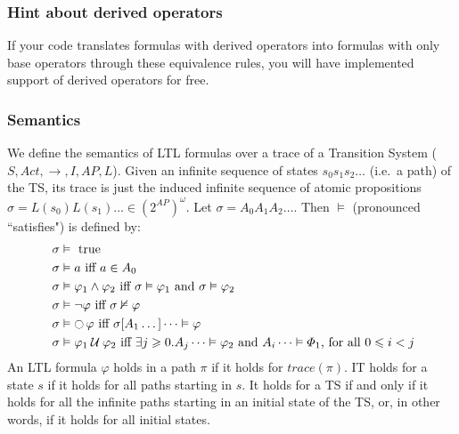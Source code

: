 \documentclass{article}
\begin{document}
\subsubsection*{Hint about derived operators}
If your code translates formulas with derived operators into formulas 
with only base operators through these equivalence rules, you will have implemented support of 
derived operators for free.

\subsubsection*{Semantics}
We define the semantics of LTL formulas over a trace of a Transition System ($S, Act, \rightarrow, I, AP, L$). 
Given an infinite sequence of states $s_0s_1s_2 \dots$ (i.e.~a path) of the TS, 
its trace is just the induced infinite sequence of atomic propositions $ \sigma = L(s_0)L(s_1) \dots \in (2^{AP})^{\omega}$.
Let $\sigma = A_0A_1A_2 \dots$. Then $\vDash$ (pronounced ``satisfies") is defined by:
\begin{align*}
    &\; \sigma \vDash \text{ true} \\
    &\; \sigma \vDash a \text{ iff } a \in A_0 \\
    &\; \sigma \vDash \varphi_1 \land \varphi_2 \text{ iff } \sigma \vDash \varphi_1 \text{ and } \sigma \vDash \varphi_2 \\
    &\; \sigma \vDash \neg \varphi \text{ iff } \sigma \nvDash \varphi \\
    &\; \sigma \vDash \mathop{\ocircle}{\varphi} \text{ iff } \sigma [A_1 \dots] \dots \vDash \varphi \\
    &\; \sigma \vDash \varphi_1 \mathbin{\mathcal{U}} \varphi_2 \text{ iff } \exists j \geqslant 0 .  A_j \dots \vDash \varphi_2 \text{ and } A_i \dots \vDash \varPhi_1 \text{, for all } 0 \leqslant  i < j
\end{align*}
An LTL formula $\varphi$ holds in a path $\pi$ if it holds for $trace(\pi)$. 
IT holds for a state $s$ if it holds for all paths starting in $s$.
It holds for a TS if and only if it holds for all the infinite paths 
starting in an initial state of the TS, or, in other words, if it holds for all initial states.
\end{document}
